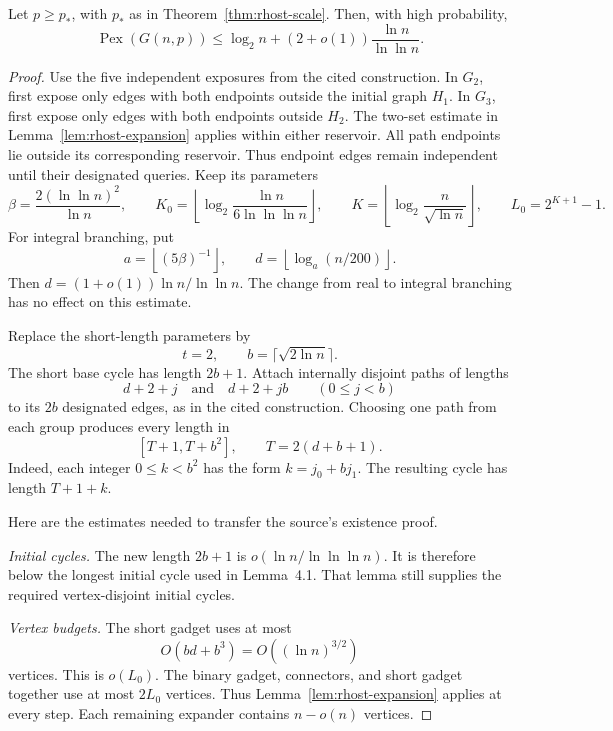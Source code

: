 \begin{proposition}
\label{prop:rhost-upper}
Let $p\ge p_*$, with $p_*$ as in Theorem~\ref{thm:rhost-scale}.
Then, with high probability,
\[
 \operatorname{Pex}(G(n,p))
 \le \log_2 n+(2+o(1))\frac{\ln n}{\ln\ln n}.
\]
\end{proposition}

\begin{proof}
Use the five independent exposures from the cited construction.
In $G_2$, first expose only edges with both endpoints outside the initial graph $H_1$.
In $G_3$, first expose only edges with both endpoints outside $H_2$.
The two-set estimate in Lemma~\ref{lem:rhost-expansion} applies within either reservoir.
All path endpoints lie outside its corresponding reservoir.
Thus endpoint edges remain independent until their designated queries.
Keep its parameters
\[
 \beta=\frac{2(\ln\ln n)^2}{\ln n},\qquad
 K_0=\left\lfloor\log_2\frac{\ln n}{6\ln\ln\ln n}\right\rfloor,
 \qquad K=\left\lfloor\log_2\frac{n}{\sqrt{\ln n}}\right\rfloor,
 \qquad L_0=2^{K+1}-1.
\]
For integral branching, put
\[
 a=\left\lfloor(5\beta)^{-1}\right\rfloor,
 \qquad d=\left\lfloor\log_a(n/200)\right\rfloor.
\]
Then $d=(1+o(1))\ln n/\ln\ln n$.
The change from real to integral branching has no effect on this estimate.

Replace the short-length parameters by
\[
 t=2,\qquad b=\lceil\sqrt{2\ln n}\rceil.
\]
The short base cycle has length $2b+1$.
Attach internally disjoint paths of lengths
\[
 d+2+j\quad\text{and}\quad d+2+jb
 \qquad(0\le j<b)
\]
to its $2b$ designated edges, as in the cited construction.
Choosing one path from each group produces every length in
\[
 [T+1,T+b^2],\qquad T=2(d+b+1).
\]
Indeed, each integer $0\le k<b^2$ has the form $k=j_0+bj_1$.
The resulting cycle has length $T+1+k$.

Here are the estimates needed to transfer the source's existence proof.

\emph{Initial cycles.}
The new length $2b+1$ is $o(\ln n/\ln\ln\ln n)$.
It is therefore below the longest initial cycle used in Lemma~4.1.
That lemma still supplies the required vertex-disjoint initial cycles.

\emph{Vertex budgets.}
The short gadget uses at most
\[
 O(bd+b^3)=O((\ln n)^{3/2})
\]
vertices.
This is $o(L_0)$.
The binary gadget, connectors, and short gadget together use at most $2L_0$ vertices.
Thus Lemma~\ref{lem:rhost-expansion} applies at every step.
Each remaining expander contains $n-o(n)$ vertices.


\end{proof}
